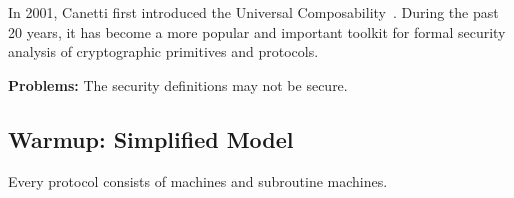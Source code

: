 In 2001, Canetti first introduced the Universal Composability~\cite{FOCS:Canetti01}. During the past 20 years, it has become a more popular and important toolkit for formal security analysis of cryptographic primitives and protocols.

\textbf{Problems:} The security definitions may not be secure. 

\subsection{Warmup: Simplified Model}

\begin{definition}
Every protocol consists of machines and subroutine machines.
    
\end{definition}